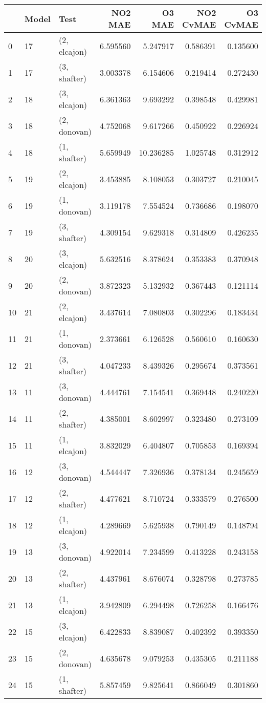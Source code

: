 \begin{tabular}{lllrrrr}
\toprule
{} & Model &          Test &   NO2 MAE &     O3 MAE &  NO2 CvMAE &  O3 CvMAE \\
\midrule
0  &    17 &  (2, elcajon) &  6.595560 &   5.247917 &   0.586391 &  0.135600 \\
1  &    17 &  (3, shafter) &  3.003378 &   6.154606 &   0.219414 &  0.272430 \\
2  &    18 &  (3, elcajon) &  6.361363 &   9.693292 &   0.398548 &  0.429981 \\
3  &    18 &  (2, donovan) &  4.752068 &   9.617266 &   0.450922 &  0.226924 \\
4  &    18 &  (1, shafter) &  5.659949 &  10.236285 &   1.025748 &  0.312912 \\
5  &    19 &  (2, elcajon) &  3.453885 &   8.108053 &   0.303727 &  0.210045 \\
6  &    19 &  (1, donovan) &  3.119178 &   7.554524 &   0.736686 &  0.198070 \\
7  &    19 &  (3, shafter) &  4.309154 &   9.629318 &   0.314809 &  0.426235 \\
8  &    20 &  (3, elcajon) &  5.632516 &   8.378624 &   0.353383 &  0.370948 \\
9  &    20 &  (2, donovan) &  3.872323 &   5.132932 &   0.367443 &  0.121114 \\
10 &    21 &  (2, elcajon) &  3.437614 &   7.080803 &   0.302296 &  0.183434 \\
11 &    21 &  (1, donovan) &  2.373661 &   6.126528 &   0.560610 &  0.160630 \\
12 &    21 &  (3, shafter) &  4.047233 &   8.439326 &   0.295674 &  0.373561 \\
13 &    11 &  (3, donovan) &  4.444761 &   7.154541 &   0.369448 &  0.240220 \\
14 &    11 &  (2, shafter) &  4.385001 &   8.602997 &   0.323480 &  0.273109 \\
15 &    11 &  (1, elcajon) &  3.832029 &   6.404807 &   0.705853 &  0.169394 \\
16 &    12 &  (3, donovan) &  4.544447 &   7.326936 &   0.378134 &  0.245659 \\
17 &    12 &  (2, shafter) &  4.477621 &   8.710724 &   0.333579 &  0.276500 \\
18 &    12 &  (1, elcajon) &  4.289669 &   5.625938 &   0.790149 &  0.148794 \\
19 &    13 &  (3, donovan) &  4.922014 &   7.234599 &   0.413228 &  0.243158 \\
20 &    13 &  (2, shafter) &  4.437961 &   8.676074 &   0.328798 &  0.273785 \\
21 &    13 &  (1, elcajon) &  3.942809 &   6.294498 &   0.726258 &  0.166476 \\
22 &    15 &  (3, elcajon) &  6.422833 &   8.839087 &   0.402392 &  0.393350 \\
23 &    15 &  (2, donovan) &  4.635678 &   9.079253 &   0.435305 &  0.211188 \\
24 &    15 &  (1, shafter) &  5.857459 &   9.825641 &   0.866049 &  0.301860 \\
\bottomrule
\end{tabular}
